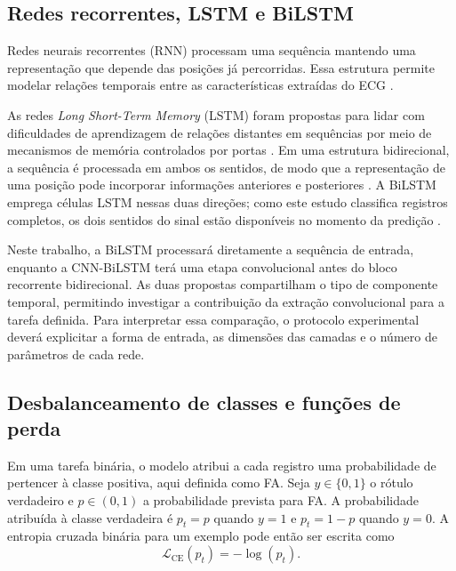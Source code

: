 \documentclass[
    12pt,                %
    openright,           %
    oneside,             %
    a4paper,             %
    english,             %
    brazil               %
]{abntex2}
\begin{document}
\subsection{Redes recorrentes, LSTM e BiLSTM}
\label{subsec:rnn_bilstm}

Redes neurais recorrentes (RNN) processam uma sequência mantendo uma representação que depende das posições já percorridas. Essa estrutura permite modelar relações temporais entre as características extraídas do ECG \cite{Goodfellow2016,Xiong2018}.

As redes \textit{Long Short-Term Memory} (LSTM) foram propostas para lidar com dificuldades de aprendizagem de relações distantes em sequências por meio de mecanismos de memória controlados por portas \cite{Hochreiter1997}. Em uma estrutura bidirecional, a sequência é processada em ambos os sentidos, de modo que a representação de uma posição pode incorporar informações anteriores e posteriores \cite{Schuster1997}. A BiLSTM emprega células LSTM nessas duas direções; como este estudo classifica registros completos, os dois sentidos do sinal estão disponíveis no momento da predição \cite{Cheng2021}.

Neste trabalho, a BiLSTM processará diretamente a sequência de entrada, enquanto a CNN-BiLSTM terá uma etapa convolucional antes do bloco recorrente bidirecional. As duas propostas compartilham o tipo de componente temporal, permitindo investigar a contribuição da extração convolucional para a tarefa definida. Para interpretar essa comparação, o protocolo experimental deverá explicitar a forma de entrada, as dimensões das camadas e o número de parâmetros de cada rede.

\subsection{Desbalanceamento de classes e funções de perda}
\label{subsec:funcoes_perda}

Em uma tarefa binária, o modelo atribui a cada registro uma probabilidade de pertencer à classe positiva, aqui definida como FA. Seja $y\in\{0,1\}$ o rótulo verdadeiro e $p\in(0,1)$ a probabilidade prevista para FA. A probabilidade atribuída à classe verdadeira é $p_t=p$ quando $y=1$ e $p_t=1-p$ quando $y=0$. A entropia cruzada binária para um exemplo pode então ser escrita como \cite{Goodfellow2016,Lin2017}
\begin{equation}
    \mathcal{L}_{\mathrm{CE}}(p_t)=-\log(p_t).
    \label{eq:ce_binaria}
\end{equation}
\end{document}
